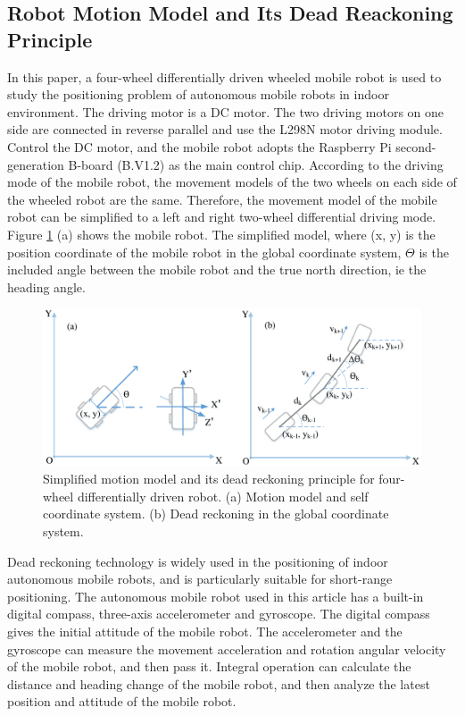 \documentclass{llncs}
\begin{document}
\subsection{Robot Motion Model and Its Dead Reackoning Principle}

In this paper, a four-wheel differentially driven wheeled mobile robot is used to study the positioning problem of autonomous mobile robots in indoor environment. The driving motor is a DC motor. The two driving motors on one side are connected in reverse parallel and use the L298N motor driving module. Control the DC motor, and the mobile robot adopts the Raspberry Pi second-generation B-board (B.V1.2) as the main control chip. According to the driving mode of the mobile robot, the movement models of the two wheels on each side of the wheeled robot are the same. Therefore, the movement model of the mobile robot can be simplified to a left and right two-wheel differential driving mode. Figure \ref{fig-model-dr} (a) shows the mobile robot. The simplified model, where (x, y) is the position coordinate of the mobile robot in the global coordinate system, $\Theta$ is the included angle between the mobile robot and the true north direction, ie the heading angle.

\begin{figure}[!htbp]
	\centering
	\includegraphics[width=4.7in]{RobotMatch-MotionModel}
	\caption{Simplified motion model and its dead reckoning principle for four-wheel differentially driven robot. (a) Motion model and self coordinate system. (b) Dead reckoning in the global coordinate system.}
	\label{fig-model-dr}
\end{figure}

Dead reckoning technology is widely used in the positioning of indoor autonomous mobile robots, and is particularly suitable for short-range positioning. The autonomous mobile robot used in this article has a built-in digital compass, three-axis accelerometer and gyroscope. The digital compass gives the initial attitude of the mobile robot. The accelerometer and the gyroscope can measure the movement acceleration and rotation angular velocity of the mobile robot, and then pass it. Integral operation can calculate the distance and heading change of the mobile robot, and then analyze the latest position and attitude of the mobile robot.
\end{document}
